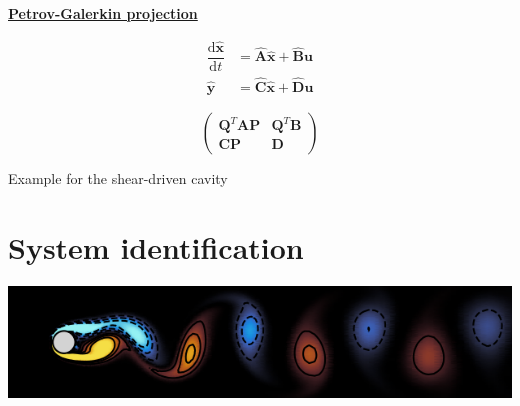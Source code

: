 \documentclass[aspectratio=169, usenames, dvipsnames]{beamer}
\begin{document}
\begin{frame}
  \vfill

  \centering
  \underline{\textbf{Petrov-Galerkin projection}}

  \bigskip

  \begin{overprint}
    \Large
    \[
    \begin{aligned}
      \dfrac{\mathrm{d} \hat{\bm{x}}}{\mathrm{d}t} & = \hat{\bm{A}} \hat{\bm{x}} + \hat{\bm{B}} \bm{u} \\
      \hat{\bm{y}} & = \hat{\bm{C}} \hat{\bm{x}} + \hat{\bm{D}} \bm{u}
    \end{aligned}
    \]

    \Large
    \[\left(
    \begin{array}{c|c}
      \bm{Q}^T \bm{A} \bm{P} & \bm{Q}^T \bm{B} \\
      \hline
      \bm{C} \bm{P} & \bm{D}
    \end{array}
    \right)
    \]

  \end{overprint}

  \vfill
\end{frame}

\begin{frame}
  Example for the shear-driven cavity
\end{frame}










\section{System identification}
\begin{frame}
  \sectionpage
\end{frame}

\begin{frame}
  \centering
  \vfill
  \includegraphics[width=\textwidth]{dns_snapshot}
  \vfill
\end{frame}
\end{document}
